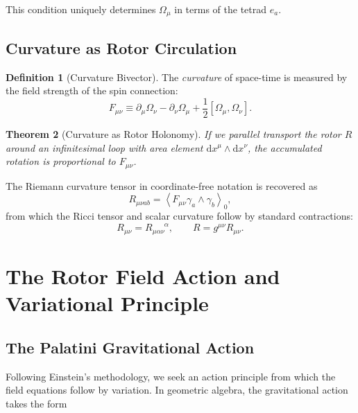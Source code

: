\documentclass[11pt,a4paper]{article}
\numberwithin{equation}{section}
\theoremstyle{plain}
\newtheorem{theorem}{Theorem}[section]
\theoremstyle{definition}
\newtheorem{definition}[theorem]{Definition}
\theoremstyle{remark}
\newcommand{\grade}[2]{\left\langle #1 \right\rangle_{#2}}
\newcommand{\scal}[1]{\grade{#1}{0}}       %
\newcommand{\dd}{\mathrm{d}}
\begin{document}
This condition uniquely determines $\Omega_\mu$ in terms of the tetrad $e_a$.

\subsection{Curvature as Rotor Circulation}

\begin{definition}[Curvature Bivector]
The \emph{curvature} of space-time is measured by the field strength of the spin connection:
\begin{equation}
F_{\mu\nu} \equiv \partial_\mu \Omega_\nu - \partial_\nu \Omega_\mu + \frac{1}{2}[\Omega_\mu, \Omega_\nu].
\label{eq:curvature-bivector}
\end{equation}
\end{definition}

\begin{theorem}[Curvature as Rotor Holonomy]
If we parallel transport the rotor $R$ around an infinitesimal loop with area element $\dd x^\mu \wedge \dd x^\nu$, the accumulated rotation is proportional to $F_{\mu\nu}$.
\end{theorem}

The Riemann curvature tensor in coordinate-free notation is recovered as
\begin{equation}
R_{\mu\nu ab} = \scal{F_{\mu\nu} \gamma_a \wedge \gamma_b},
\end{equation}
from which the Ricci tensor and scalar curvature follow by standard contractions:
\begin{equation}
R_{\mu\nu} = R_{\mu\alpha\nu}^{\phantom{\mu\alpha\nu}\alpha}, \qquad R = g^{\mu\nu}R_{\mu\nu}.
\end{equation}

\section{The Rotor Field Action and Variational Principle}
\label{sec:action}

\subsection{The Palatini Gravitational Action}

Following Einstein's methodology, we seek an action principle from which the field equations follow by variation. In geometric algebra, the gravitational action takes the form
\end{document}
